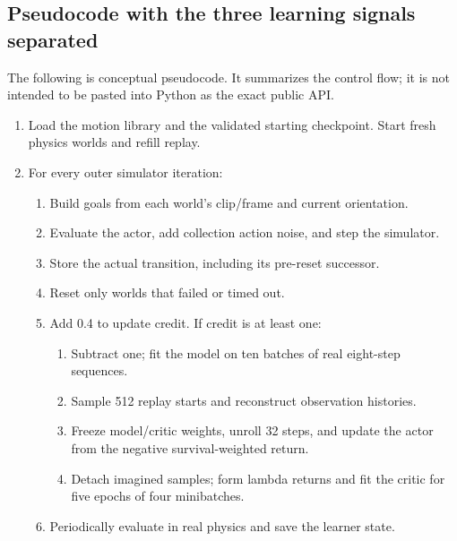 \documentclass[11pt,a4paper]{article}
\begin{document}
\subsection{Pseudocode with the three learning signals separated}
The following is conceptual pseudocode. It summarizes the control flow; it is
not intended to be pasted into Python as the exact public API.
\begin{tcolorbox}[colback=gray!4,colframe=gray!50,title=One online learning loop]
\small
\begin{enumerate}
\item Load the motion library and the validated starting checkpoint. Start fresh
physics worlds and refill replay.
\item For every outer simulator iteration:
\begin{enumerate}
\item Build goals from each world's clip/frame and current orientation.
\item Evaluate the actor, add collection action noise, and step the simulator.
\item Store the actual transition, including its pre-reset successor.
\item Reset only worlds that failed or timed out.
\item Add 0.4 to update credit. If credit is at least one:
\begin{enumerate}
\item Subtract one; fit the model on ten batches of real eight-step sequences.
\item Sample 512 replay starts and reconstruct observation histories.
\item Freeze model/critic weights, unroll 32 steps, and update the actor from
the negative survival-weighted return.
\item Detach imagined samples; form lambda returns and fit the critic for
five epochs of four minibatches.
\end{enumerate}
\item Periodically evaluate in real physics and save the learner state.
\end{enumerate}
\end{enumerate}
\end{tcolorbox}
\end{document}
